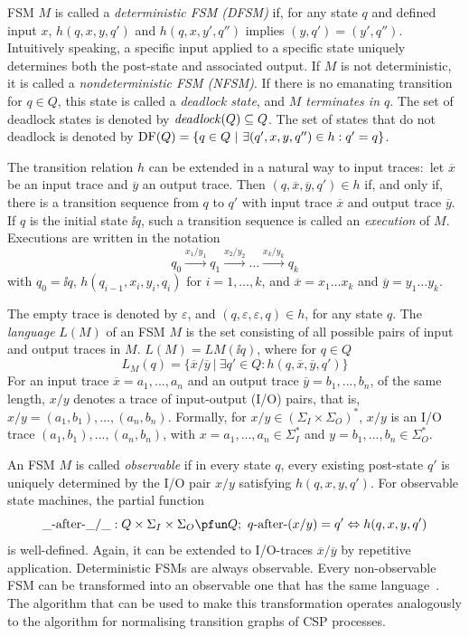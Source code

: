 FSM $M$ is called a \emph{deterministic FSM (DFSM)} if, for any state $q$ and
defined input $x$, $h(q,x,y,q')$ and $h(q,x,y',q'')$ implies $(y,q') =
(y',q'')$. Intuitively speaking, a specific input applied to a specific state
uniquely determines both the post-state and associated output. If $M$ is not
deterministic, it is called a \emph{nondeterministic FSM (NFSM)}. If there is
no emanating transition for $q\in Q$, this state is called a \emph{deadlock
state}, and \emph{$M$ terminates in $q$}. The set of deadlock states is
denoted by ${\it deadlock}(Q)\subseteq Q$. The set of states that do not deadlock
is denoted by $\text{DF}(Q) = \{ q\in Q~|~\exists (q',x,y,q'')\in h: q' = q \}$.

The transition relation $h$ can be extended in a natural way to input
traces:~let $\overline{x}$ be an input trace and $\overline{y}$ an output
trace. Then $(q,\overline{x},\overline{y},q')\in h$ if, and only if, there is
a transition sequence from $q$ to $q'$ with input trace $\overline{x}$ and
output trace $\overline{y}$. If $q$ is the initial state $\ii{q}$, such a
transition sequence is called an \emph{execution} of $M$. Executions are
written in the notation
$$
q_0 \xrightarrow{x_1/y_1} q_1 \xrightarrow{x_2/y_2} \dots \xrightarrow{x_{k}/y_{k}} q_{k}
$$
with $q_0 = \ii{q}$, $h(q_{i-1},x_i,y_i,q_{i})$ for $i = 1,\dots,k$, and
$\overline{x} = x_1\dots x_k$ and $\overline{y} = y_1\dots y_k$.

The empty trace is denoted by $\varepsilon$, and
$(q,\varepsilon,\varepsilon,q)\in h$, for any state $q$. The \emph{language}
$L(M)$ of an FSM $M$ is the set consisting of all possible pairs of input and
output traces in $M$. $L(M)= LM(\ii{q})$, where for $q\in Q$
%
$$
  L_M(q)=\{\overline{x}/\overline{y}~|~\exists q'\in Q: h(q,\overline{x},\overline{y},q')\}
$$
%
For an input trace $\overline{x} = a_1,...,a_n$ and an output trace
$\overline{y} = b_1,...,b_n$, of the same length, $x/y$ denotes a trace of
input-output (I/O) pairs, that is, $x/y =(a_1,b_1),...,(a_n,b_n)$. Formally,
for $x/y \in (\Sigma_I\times \Sigma_O)^*$, $x/y$ is an I/O trace
$(a_1,b_1),...,(a_n,b_n)$, with $x=a_1,...,a_n \in \Sigma_I^*$ and
$y=b_1,...,b_n \in \Sigma_O^*$.

An FSM $M$ is called \emph{observable} if in every state $q$, every existing
post-state $q'$ is uniquely determined by the I/O pair $x/y$ satisfying
$h(q,x,y,q')$. For observable state machines, the partial function
$$
\_ \after\_ /\_ : Q\times\Sigma_I\times \Sigma_O \pfun Q;\
q\after(x/y) = q' \Leftrightarrow h(q,x,y,q')
$$
is well-defined. Again, it can be extended to I/O-traces $\overline
x/\overline y$ by repetitive application. Deterministic FSMs are always
observable. Every non-observable FSM can be transformed into an observable
one that has the same language~\cite{PeleskaHuangLectureNotesMBT}. The
algorithm that can be used to make this transformation operates analogously
to the algorithm for normalising transition graphs of CSP processes.

